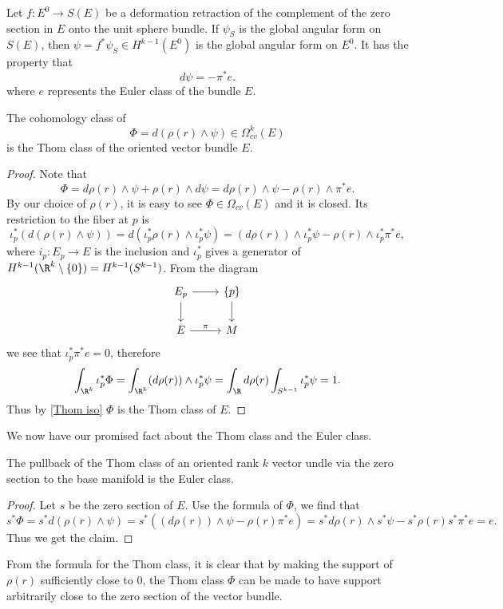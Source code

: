Let $f:E^0\to S(E)$ be a deformation retraction of the complement of the zero section in $E$ onto the unit sphere bundle. If $\psi_S$ is the global angular form on $S(E)$, 
then $\psi=f^*\psi_S\in H^{k-1}(E^0)$ is the global angular form on $E^0$. It has the property that
\[d\psi=-\pi^*e.\]
where $e$ represents the Euler class of the bundle $E$.
\begin{proposition}
The cohomology class of
\[\Phi=d(\rho(r)\wedge\psi)\in\Omega^k_{cv}(E)\]
is the Thom class of the oriented vector bundle $E$.
\end{proposition}
\begin{proof}
Note that
\[\Phi=d\rho(r)\wedge\psi+\rho(r)\wedge d\psi=d\rho(r)\wedge\psi-\rho(r)\wedge\pi^*e.\]
By our choice of $\rho(r)$, it is easy to see $\Phi\in\Omega_{cv}(E)$ and it is closed. Its restriction to the fiber at $p$ is 
\[\iota_p^*(d(\rho(r)\wedge\psi))=d(\iota_p^*\rho(r)\wedge\iota_p^*\psi)=(d\rho(r))\wedge\iota_p^*\psi-\rho(r)\wedge\iota_p^*\pi^*e,\]
where $i_p:E_p\to E$ is the inclusion and $\iota_p^*$ gives a generator of $H^{k-1}(\R^k\setminus\{0\})=H^{k-1}(S^{k-1})$. From the diagram
\[\begin{tikzcd}
E_p\ar[r]\ar[d]&\{p\}\ar[d]\\
E\ar[r,"\pi"]&M
\end{tikzcd}\]
we see that $\iota_p^*\pi^*e=0$, therefore
\[\int_{\R^k}\iota_p^*\Phi=\int_{\R^k}(d\rho(r))\wedge\iota_p^*\psi=\int_{\R}d\rho(r)\int_{S^{k-1}}\iota_p^*\psi=1.\]
Thus by \cref{Thom iso} $\Phi$ is the Thom class of $E$.
\end{proof}
We now have our promised fact about the Thom class and the Euler class.
\begin{proposition}\label{Thom class pullback Euler class}
The pullback of the Thom class of an oriented rank $k$ vector undle via the zero section to the base manifold is the Euler class.
\end{proposition}
\begin{proof}
Let $s$ be the zero section of $E$. Use the formula of $\Phi$, we find that
\[s^*\Phi=s^*d(\rho(r)\wedge\psi)=s^*((d\rho(r))\wedge\psi-\rho(r)\pi^*e)=s^*d\rho(r)\wedge s^*\psi-s^*\rho(r)s^*\pi^*e=e.\]
Thus we get the claim.
\end{proof}
\begin{remark}
From the formula for the Thom class, it is clear that by making the support of $\rho(r)$ sufficiently close to $0$, the Thom class $\Phi$ can be made to have support 
arbitrarily close to the zero section of the vector bundle.
\end{remark}
